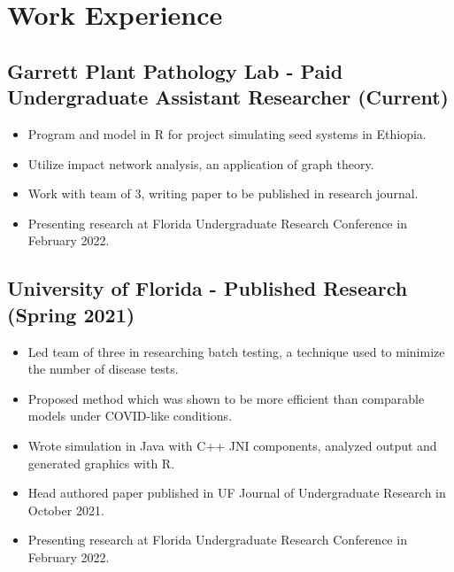 \documentclass{article}
\newcommand{\sectionspacing}{\vspace{-.4em}} %
\newenvironment{CustomItemize}
{ \begin{itemize}[leftmargin=1em]
    \setlength{\itemsep}{0pt}
    \setlength{\parskip}{0pt}
    \setlength{\parindent}{0pt}
    \setlength{\parsep}{0pt}     }
{ \end{itemize}                  }
\begin{document}

\sectionspacing{}

\section{Work Experience}

\subsection{Garrett Plant Pathology Lab - Paid Undergraduate Assistant Researcher (Current)}
\begin{CustomItemize}
\item Program and model in R for project simulating seed systems in Ethiopia.
\item Utilize impact network analysis, an application of graph theory.
\item Work with team of 3, writing paper to be published in research journal.
\item Presenting research at Florida Undergraduate Research Conference in February 2022.
\end{CustomItemize}

\subsection{University of Florida - Published Research (Spring 2021)}
\begin{CustomItemize}
\item Led team of three in researching batch testing, a technique used to minimize the number of disease tests.
\item Proposed method which was shown to be more efficient than comparable models under COVID-like conditions.
\item Wrote simulation in Java with C++ JNI components, analyzed output and generated graphics with R.
\item Head authored paper published in UF Journal of Undergraduate Research in October 2021.
\item Presenting research at Florida Undergraduate Research Conference in February 2022.
\end{CustomItemize}
\end{document}
